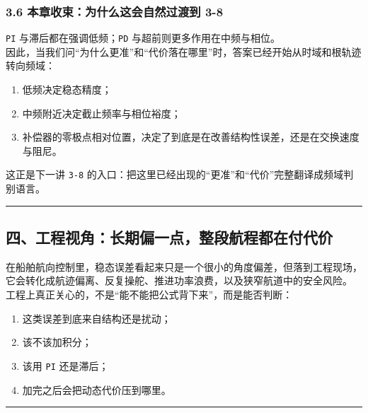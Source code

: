 \documentclass[
  11pt]{article}
\providecommand{\tightlist}{%
  \setlength{\itemsep}{0pt}\setlength{\parskip}{0pt}}
\begin{document}
\subsubsection{3.6 本章收束：为什么这会自然过渡到
3-8}\label{ux672cux7ae0ux6536ux675fux4e3aux4ec0ux4e48ux8fd9ux4f1aux81eaux7136ux8fc7ux6e21ux5230-3-8}

\texttt{PI} 与滞后都在强调低频；\texttt{PD}
与超前则更多作用在中频与相位。\\
因此，当我们问``为什么更准''和``代价落在哪里''时，答案已经开始从时域和根轨迹转向频域：

\begin{enumerate}
\def\labelenumi{\arabic{enumi}.}
\tightlist
\item
  低频决定稳态精度；
\item
  中频附近决定截止频率与相位裕度；
\item
  补偿器的零极点相对位置，决定了到底是在改善结构性误差，还是在交换速度与阻尼。
\end{enumerate}

这正是下一讲 \texttt{3-8}
的入口：把这里已经出现的``更准''和``代价''完整翻译成频域判别语言。

\begin{center}\rule{0.5\linewidth}{0.5pt}\end{center}

\subsection{四、工程视角：长期偏一点，整段航程都在付代价}\label{ux56dbux5de5ux7a0bux89c6ux89d2ux957fux671fux504fux4e00ux70b9ux6574ux6bb5ux822aux7a0bux90fdux5728ux4ed8ux4ee3ux4ef7}

在船舶航向控制里，稳态误差看起来只是一个很小的角度偏差，但落到工程现场，它会转化成航迹偏离、反复操舵、推进功率浪费，以及狭窄航道中的安全风险。\\
工程上真正关心的，不是``能不能把公式背下来''，而是能否判断：

\begin{enumerate}
\def\labelenumi{\arabic{enumi}.}
\tightlist
\item
  这类误差到底来自结构还是扰动；
\item
  该不该加积分；
\item
  该用 \texttt{PI} 还是滞后；
\item
  加完之后会把动态代价压到哪里。
\end{enumerate}

\begin{center}\rule{0.5\linewidth}{0.5pt}\end{center}
\end{document}
